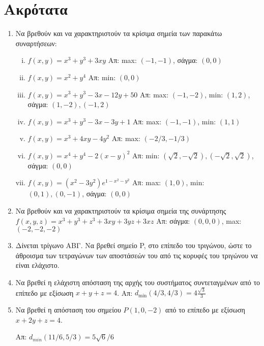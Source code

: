 


\pagestyle{askhseis}

\renewcommand{\vec}{\mathbf}



\begin{center}
  \minibox{\large \bfseries \textcolor{Col1}{Ασκήσεις στα Διανύσματα}}
\end{center}

\vspace{\baselineskip}

\section*{Ακρότατα}

\begin{enumerate}
  \item Να βρεθούν και να χαρακτηριστούν τα κρίσιμα σημεία  των παρακάτω συναρτήσεων:
    \begin{enumerate}[i)]
      \item $ f(x,y) = x^{3} + y^{3} + 3xy $ 
        \hfill Απ: max: $(-1,-1)  $, σάγμα: $ (0,0) $
      \item $ f(x,y) = x^{2}+y^{4} $ 
        \hfill Απ: min: $ (0,0) $ 
      \item $ f(x,y) = x^{3} + y^{3} - 3x -12y + 50 $ 
        \hfill Απ: max: $ (-1,-2)$, min: $ (1,2) $, 
        σάγμα: $ (1,-2), (-1,2) $
      \item $ f(x,y) = x^{3} + y^{3} -3x -3y + 1 $ 
        \hfill Απ: max: $(-1,-1)  $, min: $ (1,1) $
      \item $ f(x,y) = x^{3} + 4xy -4y^{2} $ 
        \hfill Απ: max: $ (-2/3, -1/3)  $
      \item $ f(x,y) = x^{4} + y^{4} -2(x-y)^{2}$  
        \hfill Απ: min: $ (\sqrt{2} , -\sqrt{2}), (-\sqrt{2} , \sqrt{2}) $, 
        σάγμα: $ (0,0) $
      \item $ f(x,y) = (x^{2}-3y^{2})e^{1-x^{2}-y^{2}} $ 
        \hfill Απ: max: $ (1,0)$, min: $ (0,1), (0,-1) $, 
        σάγμα: $ (0,0) $
    \end{enumerate}

  \item Να βρεθούν και να χαρακτηριστούν τα κρίσιμα σημεία της συνάρτησης 
    $ f(x,y,z) = x^{3} + y^{3}+z^{3} + 3xy +3yz + 3xz $
    \hfill Απ: σάγμα: $(0,0,0)$, max: $(-2,-2,-2)$  

  \item Δίνεται τρίγωνο ΑΒΓ. Να βρεθεί σημείο P, στο επίπεδο του τριγώνου, ώστε 
    το άθροισμα των τετραγώνων των αποστάσεών του από τις κορυφές του τριγώνου 
    να είναι ελάχιστο.

  \item Να βρεθεί η ελάχιστη απόσταση της αρχής του συστήματος συντεταγμένων από το 
    επίπεδο με εξίσωση $ x+y+z=4 $. 
    \hfill Απ: $ d_{\min}(4/3,4/3) = 4\frac{\sqrt{3}}{3} $  

  \item Να βρεθεί η απόσταση του σημείου $ P(1,0,-2) $ από το επίπεδο με εξίσωση 
    $ x+2y+z=4 $. 
    
    \hfill Απ: $ d_{min}(11/6,5/3) = 5 \sqrt{6} /6 $ 
\end{enumerate}



